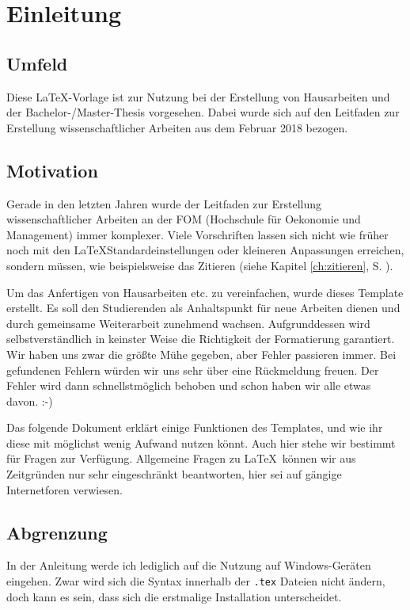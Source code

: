 \chapter{Einleitung}\label{ch:einleitung}

\section{Umfeld}

Diese \LaTeX -Vorlage ist zur Nutzung bei der Erstellung von Hausarbeiten und der Bachelor-/Master-Thesis vorgesehen. 
Dabei wurde sich auf den Leitfaden zur Erstellung wissenschaftlicher Arbeiten aus dem Februar 2018 bezogen.\autocite[Vgl.][]{leitfaden}

\section{Motivation}

Gerade in den letzten Jahren wurde der Leitfaden zur Erstellung wissenschaftlicher Arbeiten an der FOM (Hochschule für Oekonomie und Management) immer komplexer. 
Viele Vorschriften lassen sich nicht wie früher noch mit den \LaTeX\-Standardeinstellungen oder kleineren Anpassungen erreichen, sondern müssen, wie beispielsweise das Zitieren (siehe Kapitel \ref{ch:zitieren}, S. \pageref{ch:zitieren}).

Um das Anfertigen von Hausarbeiten etc. zu vereinfachen, wurde dieses Template erstellt. 
Es soll den Studierenden als Anhaltspunkt für neue Arbeiten dienen und durch gemeinsame Weiterarbeit zunehmend wachsen.
Aufgrunddessen wird selbstverständlich in keinster Weise die Richtigkeit der Formatierung garantiert. 
Wir haben uns zwar die größte Mühe gegeben, aber Fehler passieren immer. 
Bei gefundenen Fehlern würden wir uns sehr über eine Rückmeldung freuen. 
Der Fehler wird dann schnellstmöglich behoben und schon haben wir alle etwas davon. :-)

Das folgende Dokument erklärt einige Funktionen des Templates, und wie ihr diese mit möglichst wenig Aufwand nutzen könnt. Auch hier stehe wir bestimmt für Fragen zur Verfügung. Allgemeine Fragen zu \LaTeX\ können wir aus Zeitgründen nur sehr eingeschränkt beantworten, hier sei auf gängige Internetforen verwiesen.

\section{Abgrenzung}
In der Anleitung werde ich lediglich auf die Nutzung auf Windows-Geräten eingehen. 
Zwar wird sich die Syntax innerhalb der \texttt{.tex} Dateien nicht ändern, doch kann es sein, dass sich die erstmalige Installation unterscheidet.